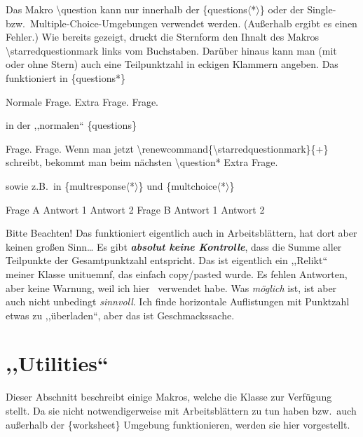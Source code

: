 \documentclass[hyperworksheet]{drcschool}
\newcommand*{\cs}[1]{\textup{\ttfamily\textbackslash#1}}                        %
\newcommand*{\str}[1]{\textup{\ttfamily\string#1}}                              %
\newcommand*{\pkg}[1]{\textup{\ttfamily#1}}                                     %
\newcommand*{\env}[1]{\textup{\ttfamily\{#1\}}}                                 %
\newcommand*{\optstar}{\mbox{\ttfamily$\langle$*$\rangle$}}                     %
\begin{document}
\begin{test}[2,M,class=9a,date=32.\ Oktober 2022,v=A,ptspre=>,ptspost=<,logo=example-image]
\exercise[2]
Das Makro \cs{question} kann nur innerhalb der \env{questions\optstar}
oder der Single- bzw.~Multiple-Choice-Umgebungen verwendet werden.
(Außerhalb ergibt es einen Fehler.) Wie bereits gezeigt, druckt die
Sternform den Ihnalt des Makros \cs{starredquestionmark}
links vom Buchstaben. Darüber hinaus kann man (mit oder ohne Stern)
auch eine Teilpunktzahl in eckigen Klammern angeben. Das funktioniert in
\env{questions*}
\begin{questions*}{3}
\question Normale Frage.
\question* Extra Frage.
\question[1] Frage.
\end{questions*}
in der ,,normalen`` \env{questions}
\begin{questions}
\question[0,5] Frage.
\question[2] Frage. Wenn man jetzt \cs{renewcommand\{\textbackslash starredquestionmark\}\{+\}} schreibt,
bekommt man beim nächsten \cs{question*}\renewcommand*{\starredquestionmark}{+}
\question*[1,5] Extra Frage.
\end{questions}
sowie z.B.~in \env{multresponse\optstar} und  \env{multchoice\optstar}
\begin{multresponse}
\question*[1] Frage A
\choice Antwort 1
\choice* Antwort 2
\question Frage B
\choice* Antwort 1
\choice* Antwort 2
\end{multresponse}
\begin{solution}
\answer Bitte Beachten!
\answer Das funktioniert eigentlich auch in Arbeitsblättern, hat dort aber keinen großen Sinn\ldots
\answer Es gibt {\itshape\bfseries absolut keine Kontrolle}, dass die Summe aller Teilpunkte der Gesamtpunktzahl entspricht.
\answer Das ist eigentlich ein ,,Relikt`` meiner Klasse \pkg{unituemnf}, das einfach copy/pasted wurde.
\answer Es fehlen Antworten, aber keine Warnung, weil ich hier \NoCheck\str\NoCheck\ verwendet habe.
\answer Was \emph{möglich} ist, ist aber auch nicht unbedingt \emph{sinnvoll}. Ich finde
horizontale Auflistungen mit Punktzahl etwas zu ,,überladen``, aber das ist Geschmackssache.
\end{solution}
\end{test}


\cleardoublepage
\section{,,Utilities``}
Dieser Abschnitt beschreibt einige Makros, welche die Klasse zur Verfügung stellt.
Da sie nicht notwendigerweise mit Arbeitsblättern zu tun haben bzw.~auch außerhalb der
\env{worksheet} Umgebung funktionieren, werden sie hier vorgestellt.
\end{document}
